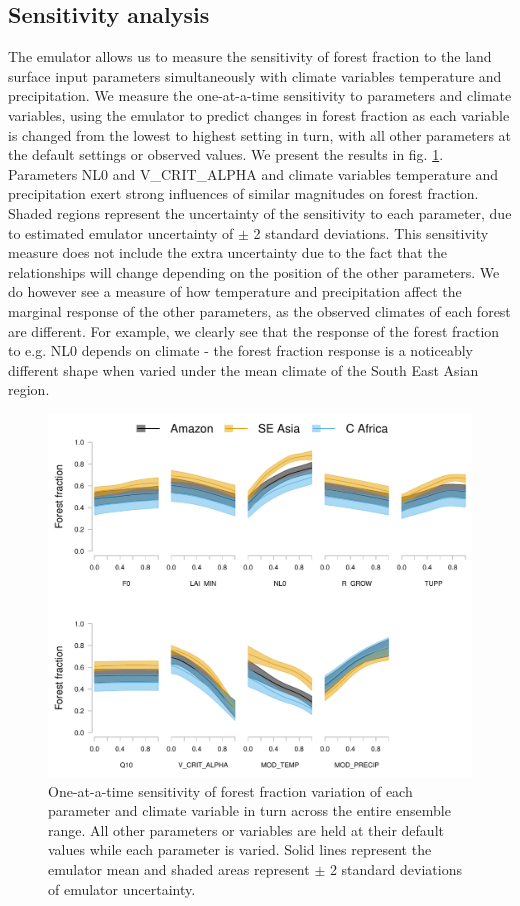 \documentclass[gmd, manuscript]{copernicus}
\begin{document}
\subsection{Sensitivity analysis}\label{ssec:sensitivity}
The emulator allows us to measure the sensitivity of forest fraction to the land surface input parameters simultaneously with climate variables temperature and precipitation. We measure the one-at-a-time sensitivity to parameters and climate variables, using the emulator to predict changes in forest fraction as each variable is changed from the lowest to highest setting in turn, with all other parameters at the default settings or observed values. We present the results in fig. \ref{fig:sensitivity_TP_all}. Parameters NL0 and V\_CRIT\_ALPHA and climate variables temperature and precipitation exert strong influences of similar magnitudes on forest fraction. Shaded regions represent the uncertainty of the sensitivity to each parameter, due to estimated emulator uncertainty of $\pm$ 2 standard deviations. This sensitivity measure does not include the extra uncertainty due to the fact that the relationships will change depending on the position of the other parameters. We do however see a measure of how temperature and precipitation affect the marginal response of the other parameters, as the observed climates of each forest are different. For example, we clearly see that the response of the forest fraction to e.g. NL0 depends on climate - the forest fraction response is a noticeably different shape when varied under the mean climate of the South East Asian region.

\begin{figure}[t]
\includegraphics[width=12cm]{../graphics/sensitivity_TP_all.pdf}
\caption{One-at-a-time sensitivity of forest fraction variation of each parameter and climate variable in turn across the entire ensemble range. All other parameters or variables are held at their default values while each parameter is varied. Solid lines represent the emulator mean and shaded areas represent $\pm$ 2 standard deviations of emulator uncertainty.
}
\label{fig:sensitivity_TP_all}
\end{figure}
\end{document}
